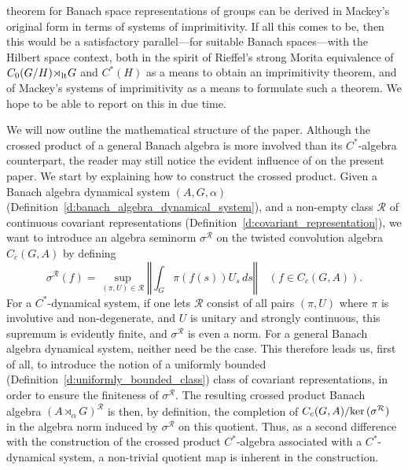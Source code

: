 \documentclass{amsart}
\theoremstyle{plain}
\theoremstyle{definition}
\numberwithin{equation}{section}
\begin{document}
theorem for Banach space representations of groups can be derived in Mackey's original form in terms of systems of imprimitivity. If all this comes to be, then this would be a satisfactory parallel---for suitable Banach spaces---with the Hilbert space context, both in the spirit of Rieffel's strong Morita equivalence of $C_0(G/H){\rtimes}_{\textup{lt}}G$ and $C^*(H)$ as a means to obtain an imprimitivity theorem, and of Mackey's systems of imprimitivity as a means to formulate such a theorem. We hope to be able to report on this in due time.

\medskip
We will now outline the mathematical structure of the paper. Although the crossed product of a general Banach algebra is more involved than its $C^*$-algebra counterpart, the reader may still notice the evident influence of \cite{williams} on the present paper. We start by explaining how to construct the crossed product. Given a Banach algebra dynamical system ${(A,G,\alpha)}$ (Definition~\ref{d:banach_algebra_dynamical_system}), and a non-empty class ${\mathcal R}$ of continuous covariant representations (Definition~\ref{d:covariant_representation}), we want to introduce an algebra seminorm ${\sigma^{\mathcal R}}$ on the twisted convolution algebra $C_c(G,A)$ by defining
\[
{\sigma^{\mathcal R}}(f)=\sup_{{(\pi,U)}\in{\mathcal R}}\left\Vert\int_G \pi(f(s))U_s{\,ds}\right\Vert\quad(f\in C_c(G,A)).
\]
For a $C^*$-dynamical system, if one lets ${\mathcal R}$ consist of all pairs ${(\pi,U)}$ where $\pi$ is involutive and non-degenerate, and $U$ is unitary and strongly continuous, this supremum is evidently finite, and ${\sigma^{\mathcal R}}$ is even a norm. For a general Banach algebra dynamical system, neither need be the case. This therefore leads us, first of all, to introduce the notion of a uniformly bounded (Definition~\ref{d:uniformly_bounded_class}) class of covariant representations, in order to ensure the finiteness of ${\sigma^{\mathcal R}}$. The resulting crossed product Banach algebra ${(A {\rtimes}_\alpha G)^\mathcal{R}}$ is then, by definition, the completion of $C_c(G,A)/\textup{ker\,}({\sigma^{\mathcal R}})$ in the algebra norm induced by ${\sigma^{\mathcal R}}$ on this quotient. Thus, as a second difference with the construction of the crossed product $C^*$-algebra associated with a $C^*$-dynamical system, a non-trivial quotient map is inherent in the construction. 
\end{document}
